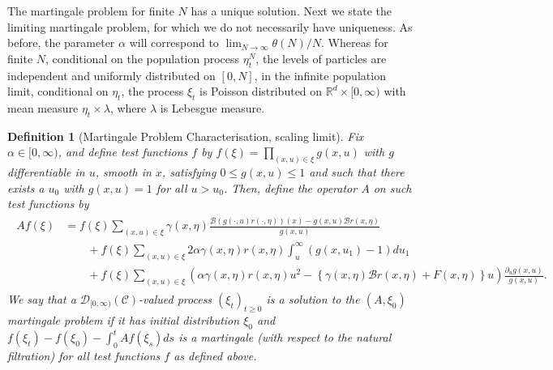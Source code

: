 \documentclass[12pt]{article}
\newtheorem{definition}[theorem]{Definition}
\newcommand{\IR}{\mathbb R}
\newcommand{\DG}{\mathcal{B}}  %
\newcommand{\lp}{\xi}              %
\numberwithin{equation}{section}
\begin{document}
The martingale problem for finite $N$ has a unique solution.
Next we state the limiting martingale problem,
for which we do not necessarily have uniqueness.
As before, the parameter $\alpha$ will correspond to 
$\lim_{N\to\infty}\theta(N)/N$. Whereas for finite $N$, conditional
on the population process $\eta_t^N$, the levels of particles are
independent and 
uniformly distributed on $[0,N]$, in the infinite population limit, 
conditional on $\eta_t$, the process $\xi_t$ is Poisson distributed on 
$\IR^d\times [0,\infty)$ with mean measure $\eta_t\times\lambda$, where 
$\lambda$ %
is Lebesgue measure.

\begin{definition}[Martingale Problem Characterisation, scaling limit]
    \label{defn:limiting_lookdown_mgale}
    Fix $\alpha \in [0, \infty)$, and define  
    test functions $f$ by 
    $f(\xi) = \prod_{(x, u) \in \xi} g(x, u)$ 
	with $g$ differentiable in $u$, smooth in $x$, satisfying 
$0\leq g(x,u)\leq 1$ and
    such that there exists a $u_0$ with $g(x, u) = 1$ for all $u > u_0$.
    Then, define the operator $A$ on such test functions by 
    \begin{align} \begin{split} \label{eqn:limiting_lookdown_generator}
    A f(\lp)
    &=
        f(\lp)  \sum_{(x, u) \in \xi}
        \gamma(x, \eta)
            \frac{
                \DG(g(\cdot, u) r(\cdot, \eta))(x) - g(x,u) \DG r(x,\eta)
            }{
                g(x, u)
            }
    \\ &\qquad {} +
        f(\lp) \sum_{(x, u) \in \xi}
        2 \alpha \gamma(x, \eta) r(x, \eta) \int_u^\infty (g(x, u_1) - 1) du_1
    \\ &\qquad {} +
        f(\lp) \sum_{(x, u) \in \xi}
        \left(
            \alpha \gamma(x, \eta) r(x, \eta) u^2
            -
            \left\{
                \gamma(x, \eta) \DG r(x, \eta) + F(x, \eta)
            \right\} u
        \right)
        \frac{\partial_u g(x, u)}{ g(x,u) }  .
    \end{split} \end{align}
    We say that a ${\mathcal D}_{[0,\infty)}(\mathcal{C})$-valued process $(\xi_t)_{t \ge 0}$
    is a solution to the $(A, \lp_0)$ martingale problem
    if it has initial distribution $\lp_0$
    and $f(\lp_t) - f(\lp_0)-\int_0^t Af(\lp_s) ds$ is a martingale (with
respect to the natural filtration) for all 
test functions $f$
    as defined above.
\end{definition}
\end{document}
